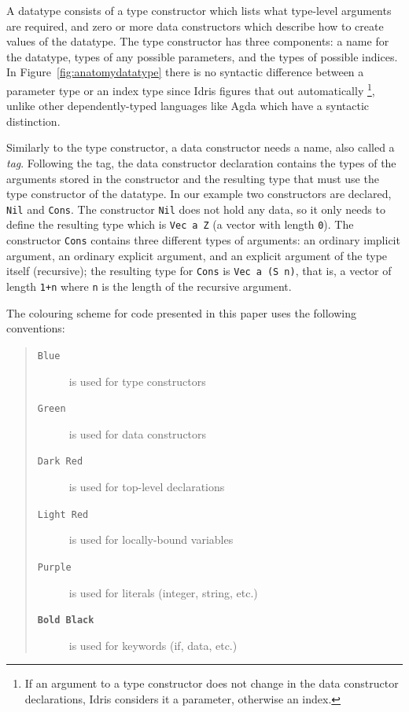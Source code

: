 \documentclass{ituthesis}
\newcommand{\ttconstructor}[1]{\textcolor{constructor-color}{\texttt{#1}}}
\newcommand{\tttype}[1]{\textcolor{type-color}{\texttt{#1}}}
\newcommand{\ttdec}[1]{\textcolor{declared-var-color}{\texttt{#1}}}
\newcommand{\ttvar}[1]{\textcolor{local-var-color}{\texttt{#1}}}
\newcommand{\ttliteral}[1]{\textcolor{literal-color}{\texttt{#1}}}
\theoremstyle{break}
\newenvironment{asideblock}
  {\begin{mdframed}[style=0,%
      leftline=false,rightline=false,leftmargin=2em,rightmargin=2em,%
          innerleftmargin=0pt,innerrightmargin=0pt,linewidth=0.75pt,%
      skipabove=7pt,skipbelow=7pt]\small}
  {\end{mdframed}}
\begin{document}
A datatype consists of a type constructor which lists what type-level arguments are required, and zero or more data constructors which describe how to create values of the datatype.
The type constructor has three components: a name for the datatype, types of any possible parameters, and the types of possible indices.
In Figure~\ref{fig:anatomydatatype} there is no syntactic difference between a parameter type or an index type since Idris figures that out automatically
\footnote{If an argument to a type constructor does not change in the data constructor declarations, Idris considers it a parameter, otherwise an index.},
unlike other dependently-typed languages like Agda which have a syntactic distinction.

Similarly to the type constructor, a data constructor needs a name, also called a \textit{tag}.
Following the tag, the data constructor declaration contains the types of the arguments stored in the constructor and the resulting type that must use the type constructor of the datatype.
In our example two constructors are declared, \ttconstructor{Nil} and \ttconstructor{Cons}.
The constructor \ttconstructor{Nil} does not hold any data, so it only needs to define the resulting type which is \tttype{Vec}~\ttvar{a}~\ttconstructor{Z} (a vector with length \ttliteral{0}).
The constructor \ttconstructor{Cons} contains three different types of arguments: an ordinary implicit argument, an ordinary explicit argument, and an explicit argument of the type itself (recursive); the resulting type for \ttconstructor{Cons} is \tttype{Vec}~\ttvar{a}~\texttt{(}\ttconstructor{S}~\ttvar{n}\texttt{)}, that is, a vector of length \ttliteral{1}\texttt{+}\ttvar{n} where \ttvar{n} is the length of the recursive argument.

\begin{asideblock}
  The colouring scheme for code presented in this paper uses the following conventions:
  \begin{quote}
  \begin{description}
    \item[\tttype{Blue}] is used for type constructors
    \item[\ttconstructor{Green}] is used for data constructors
    \item[\ttdec{Dark Red}] is used for top-level declarations
    \item[\ttvar{Light Red}] is used for locally-bound variables
    \item[\ttliteral{Purple}] is used for literals (integer, string, etc.)
    \item[\texttt{\textbf{Bold Black}}] is used for keywords (if, data, etc.)
  \end{description}
  \end{quote}

\end{asideblock}
\end{document}
